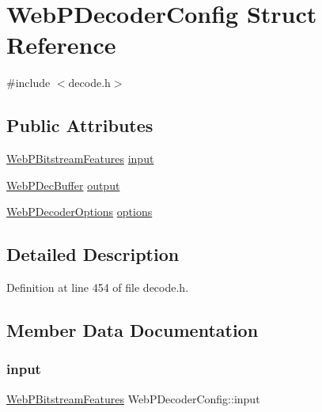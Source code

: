 \hypertarget{struct_web_p_decoder_config}{}\section{Web\+P\+Decoder\+Config Struct Reference}
\label{struct_web_p_decoder_config}


{\ttfamily \#include $<$decode.\+h$>$}

\subsection*{Public Attributes}
\begin{DoxyCompactItemize}
\item 
\mbox{\hyperlink{struct_web_p_bitstream_features}{Web\+P\+Bitstream\+Features}} \mbox{\hyperlink{struct_web_p_decoder_config_a9bfb9095504e4ccc692651bd12e5bd47}{input}}
\item 
\mbox{\hyperlink{struct_web_p_dec_buffer}{Web\+P\+Dec\+Buffer}} \mbox{\hyperlink{struct_web_p_decoder_config_abd6e5ba792753fae7e8a123323f343b4}{output}}
\item 
\mbox{\hyperlink{struct_web_p_decoder_options}{Web\+P\+Decoder\+Options}} \mbox{\hyperlink{struct_web_p_decoder_config_a06921f434d359574eba37f6aedd33a6a}{options}}
\end{DoxyCompactItemize}


\subsection{Detailed Description}


Definition at line 454 of file decode.\+h.



\subsection{Member Data Documentation}
\mbox{\label{struct_web_p_decoder_config_a9bfb9095504e4ccc692651bd12e5bd47}} 
\subsubsection{\texorpdfstring{input}{input}}
{\footnotesize\ttfamily \mbox{\hyperlink{struct_web_p_bitstream_features}{Web\+P\+Bitstream\+Features}} Web\+P\+Decoder\+Config\+::input}



